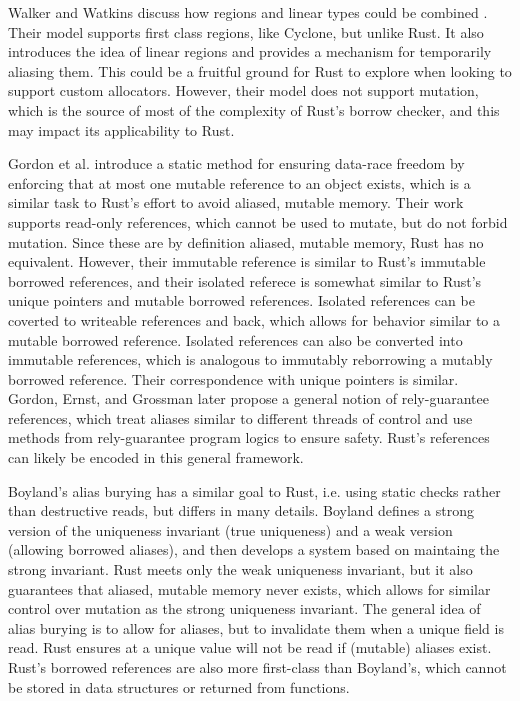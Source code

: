 Walker and Watkins discuss how regions and linear types could be combined \cite{regionsandlinear}.
Their model supports first class regions, like Cyclone, but unlike Rust.
It also introduces the idea of linear regions and provides a mechanism for
temporarily aliasing them. This could be a fruitful ground for Rust to explore
when looking to support custom allocators.
However, their model does not support mutation, which is the source of most of the complexity
of Rust's borrow checker, and this may impact its applicability to Rust. 

Gordon et al. \cite{uniqueandrefimm} introduce a static method for ensuring data-race freedom
by enforcing that at most one mutable reference to an object exists, which is a similar task
to Rust's effort to avoid aliased, mutable memory.
Their work supports read-only references, which cannot be used to mutate, but do not forbid
mutation. Since these are by definition aliased, mutable memory, Rust has no equivalent.
However, their immutable reference is similar to Rust's immutable borrowed references,
and their isolated referece is somewhat similar to Rust's unique pointers and mutable
borrowed references. Isolated references can be coverted to writeable references and back,
which allows for behavior similar to a mutable borrowed reference. Isolated references
can also be converted into immutable references, which is analogous to immutably reborrowing
a mutably borrowed reference. Their correspondence with unique pointers is similar.
Gordon, Ernst, and Grossman \cite{relyguarantee} later propose a general notion of
rely-guarantee references, which treat aliases similar to different threads of control
and use methods from rely-guarantee program logics to ensure safety. Rust's references
can likely be encoded in this general framework.

Boyland's alias burying \cite{aliasburying} has a similar goal to Rust, i.e.
using static checks rather than destructive reads, but differs in many details.
Boyland defines a strong version of the uniqueness invariant (true uniqueness) and a weak
version (allowing borrowed aliases), and then develops a system based on maintaing
the strong invariant. Rust meets only the weak uniqueness invariant, but it also
guarantees that aliased, mutable memory never exists, which allows for similar control
over mutation as the strong uniqueness invariant. The general idea of alias burying
is to allow for aliases, but to invalidate them when a unique field is read.
Rust ensures at a unique value will not be read if (mutable) aliases exist.
Rust's borrowed references are also more first-class than Boyland's, which cannot
be stored in data structures or returned from functions.

